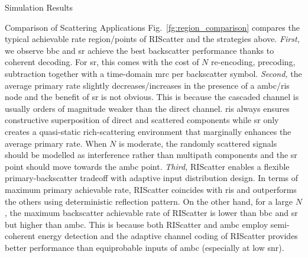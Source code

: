 \documentclass[journal]{IEEEtran}
\begin{document}
\begin{section}{Simulation Results}
\begin{subsection}{Comparison of Scattering Applications}
		Fig.~\ref{fg:region_comparison} compares the typical achievable rate region/points of RIScatter and the strategies above.
		\emph{First,} we observe \gls{bbc} and \gls{sr} achieve the best backscatter performance thanks to coherent decoding.
		For \gls{sr}, this comes with the cost of $N$ re-encoding, precoding, subtraction together with a time-domain \gls{mrc} per backscatter symbol.
		\emph{Second,} the average primary rate slightly decreases/increases in the presence of a \gls{ambc}/\gls{ris} node and the benefit of \gls{sr} is not obvious.
		This is because the cascaded channel is usually orders of magnitude weaker than the direct channel.
		\gls{ris} always ensures constructive superposition of direct and scattered components while \gls{sr} only creates a quasi-static rich-scattering environment that marginally enhances the average primary rate.
		When $N$ is moderate, the randomly scattered signals should be modelled as interference rather than multipath components and the \gls{sr} point should move towards the \gls{ambc} point.
		\emph{Third,} RIScatter enables a flexible primary-backscatter tradeoff with adaptive input distribution design.
		In terms of maximum primary achievable rate, RIScatter coincides with \gls{ris} and outperforms the others using deterministic reflection pattern.
		On the other hand, for a large $N$, the maximum backscatter achievable rate of RIScatter is lower than \gls{bbc} and \gls{sr} but higher than \gls{ambc}.
		This is because both RIScatter and \gls{ambc} employ semi-coherent energy detection and the adaptive channel coding of RIScatter provides better performance than equiprobable inputs of \gls{ambc} (especially at low \gls{snr}).
	\end{subsection}


\end{section}
\end{document}
